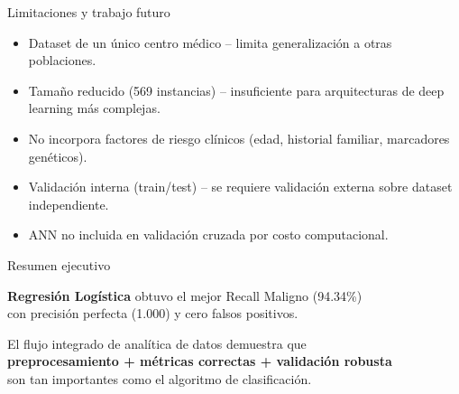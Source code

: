 \documentclass[10pt,aspectratio=169]{beamer}
\begin{document}
\begin{frame}{Limitaciones y trabajo futuro}
\begin{itemize}
  \item Dataset de un único centro médico -- limita generalización a otras poblaciones.
  \item Tamaño reducido (569 instancias) -- insuficiente para arquitecturas de deep learning más complejas.
  \item No incorpora factores de riesgo clínicos (edad, historial familiar, marcadores genéticos).
  \item Validación interna (train/test) -- se requiere validación externa sobre dataset independiente.
  \item ANN no incluida en validación cruzada por costo computacional.
\end{itemize}
\end{frame}

\begin{frame}{Resumen ejecutivo}
\begin{center}
\Large
\textbf{Regresión Logística} obtuvo el mejor Recall Maligno (94.34\%)\\
con precisión perfecta (1.000) y cero falsos positivos.
\end{center}

\vspace{1em}
\begin{center}
\large
El flujo integrado de analítica de datos demuestra que\\
\textbf{preprocesamiento + métricas correctas + validación robusta}\\
son tan importantes como el algoritmo de clasificación.
\end{center}
\end{frame}

\backmatter
\end{document}
